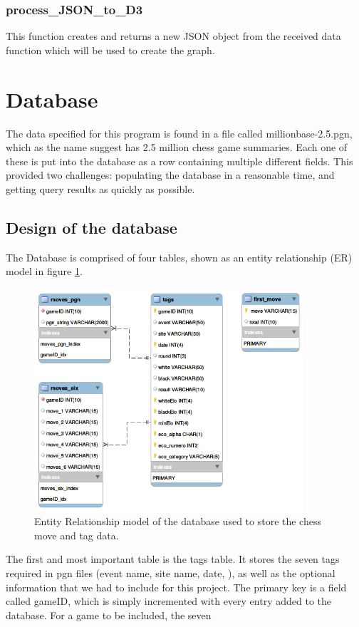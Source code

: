 \documentclass{article}
\begin{document}
\subsubsection*{process\_JSON\_to\_D3}
This function creates and returns a new JSON object from the received
data function which will be used to create the graph.

\section{Database}
The data specified for this program is found in a file called
millionbase-2.5.pgn, which as the name suggest has 2.5 million chess game
summaries. Each one of these is put into the database as a row containing
multiple different fields.  This provided two challenges:  populating the
database in a reasonable time, and getting query results as quickly as
possible.

\subsection{Design of the database}
The Database is comprised of four tables, shown as an entity relationship
(ER) model in figure \ref{figure:4}. 

\begin{figure}[h]
	\includegraphics[width=10cm]{EER}
	\caption{Entity Relationship model of the database used to store the
	chess move and tag data.}
	\label{figure:4}
\end{figure}

The first and most important table is the tags table.  It stores the seven
tags required in pgn files (event name, site name, date, 
), as well as the optional information that we had
to include for this project.  The primary key is a field called gameID,
which is simply incremented with every entry added to the database.  For a
game to be included, the seven 
\end{document}
